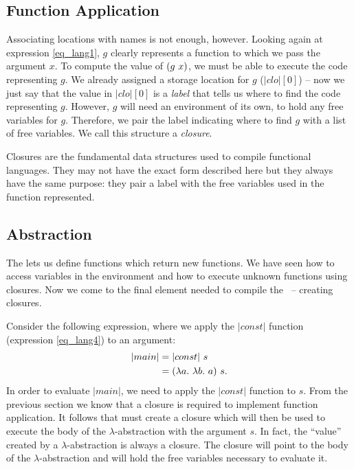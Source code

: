 \documentclass[12pt]{report}
\begin{document}
\subsection{Function Application}
\label{subsec_lang2}

Associating locations with names is not enough, however. Looking again
at expression \ref{eq_lang1}, $g$ clearly represents a function to
which we pass the argument $x$. To compute the value of
$(g\ x)$, we must be able to execute the code representing
$g$. We already assigned a storage location for $g$ ($|clo|[0]$) -- now
we just say that the value in $|clo|[0]$ is a \emph{label} that tells
us where to find the code representing $g$. However, $g$ will need
an environment of its own, to hold any free variables for $g$. Therefore,
we pair the label indicating where to find $g$ with a list of free
variables. We call this structure a \emph{closure}.

Closures are the fundamental data structures used to compile
functional languages. They may not have the exact form described here
but they always have the same purpose: they pair a label with the free
variables used in the function represented. 

\subsection{Abstraction}
\label{subsec_lang3}
The \lamA lets us define functions which return new functions. We have
seen how to access variables in the environment and how to execute
unknown functions using closures. Now we come to the final element
needed to compile the \lamA\ -- creating closures.

Consider the following expression, where we apply the $|const|$ function (expression 
\ref{eq_lang4}) to an argument:
\begin{equation}
  \begin{split}
    |main| &= |const|\ s \\
         &= (\lambda a.\ \lambda b.\ a)\ s.
  \end{split}
\end{equation}
In order to evaluate $|main|$, we need to apply the $|const|$ function
to $s$. From the previous section we know that a closure is required to
implement function application. It follows that
 must create a closure which will
then be used to execute the body of the $\lambda$-abstraction with the
argument $s$. In fact, the ``value'' created by a
$\lambda$-abstraction is always a closure. The closure will point to
the body of the $\lambda$-abstraction and will hold the free variables
necessary to evaluate it.
\end{document}

